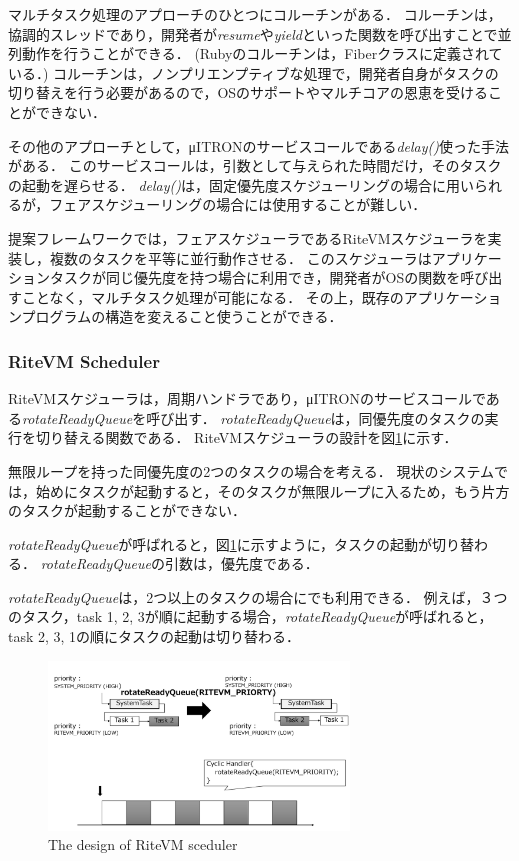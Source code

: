\documentclass[submit]{ipsj_v2/UTF8/ipsj}
\begin{document}
マルチタスク処理のアプローチのひとつにコルーチンがある．
コルーチンは，協調的スレッドであり，開発者が{\it resume}や{\it yield}といった関数を呼び出すことで並列動作を行うことができる．
(Rubyのコルーチンは，Fiberクラスに定義されている．\cite{url:co-routine})
コルーチンは，ノンプリエンプティブな処理で，開発者自身がタスクの切り替えを行う必要があるので，OSのサポートやマルチコアの恩恵を受けることができない．

その他のアプローチとして，μITRONのサービスコールである{\it delay()}使った手法がある．
このサービスコールは，引数として与えられた時間だけ，そのタスクの起動を遅らせる．
{\it delay()}は，固定優先度スケジューリングの場合に用いられるが，フェアスケジューリングの場合には使用することが難しい．

提案フレームワークでは，フェアスケジューラであるRiteVMスケジューラを実装し，複数のタスクを平等に並行動作させる．
このスケジューラはアプリケーションタスクが同じ優先度を持つ場合に利用でき，開発者がOSの関数を呼び出すことなく，マルチタスク処理が可能になる．
その上，既存のアプリケーションプログラムの構造を変えること使うことができる． 

\subsubsection{RiteVM Scheduler}
RiteVMスケジューラは，周期ハンドラであり，μITRONのサービスコールである{\it rotateReadyQueue}を呼び出す．
{\it rotateReadyQueue}は，同優先度のタスクの実行を切り替える関数である．
RiteVMスケジューラの設計を図\ref{fig:rotateReadyQueue}に示す．

無限ループを持った同優先度の2つのタスクの場合を考える．
現状のシステムでは，始めにタスクが起動すると，そのタスクが無限ループに入るため，もう片方のタスクが起動することができない．

{\it rotateReadyQueue}が呼ばれると，図\ref{fig:rotateReadyQueue}に示すように，タスクの起動が切り替わる．
{\it rotateReadyQueue}の引数は，優先度である．

{\it rotateReadyQueue}は，2つ以上のタスクの場合にでも利用できる．
例えば，３つのタスク，task 1, 2, 3が順に起動する場合，{\it rotateReadyQueue}が呼ばれると，task 2, 3, 1の順にタスクの起動は切り替わる．

\begin{figure}[t]
    \centering
    \includegraphics[width=8cm,clip]{../EMSOFT2016/figure/rotateReadyQueue.pdf}
    \caption{The design of RiteVM sceduler}
    \label{fig:rotateReadyQueue}
\end{figure} 
 
\end{document}
